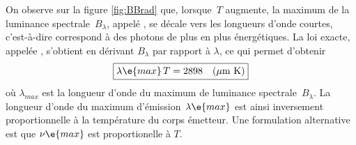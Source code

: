 \sk
On observe sur la figure \ref{fig:BBrad} que, lorsque~$T$ augmente, la maximum de la luminance spectrale~$B_\lambda$, appelé , se décale vers les longueurs d'onde courtes, c'est-à-dire correspond à des photons de plus en plus énergétiques. La loi exacte, appelée , s'obtient en dérivant $B_\lambda$ par rapport à $\lambda$, ce qui permet d'obtenir $$ \boxed{ \lambda\e{max} \, T = 2898 \quad (\mu\textrm{m~K}) } $$ où $\lambda_{max}$ est la longueur d'onde du maximum de luminance spectrale~$B_\lambda$. La longueur d'onde du maximum d'émission~$\lambda\e{max}$ est ainsi inversement proportionnelle à la température du corps émetteur. Une formulation alternative est que $\nu\e{max}$ est proportionelle à $T$.


